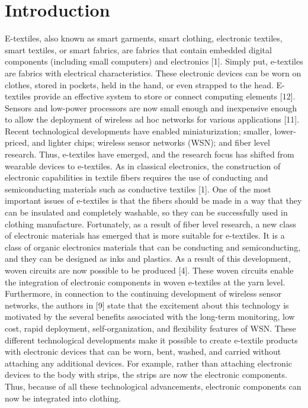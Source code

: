 \chapter{Introduction}
\label{chapter:Introduction}



	E-textiles, also known as smart garments, smart clothing, electronic textiles, smart textiles, or smart fabrics, are fabrics that contain embedded digital components (including small computers) and electronics [1]. Simply put, e-textiles are fabrics with electrical characteristics. These electronic devices can be worn on clothes, stored in pockets, held in the hand, or even strapped to the head. E-textiles provide an effective system to store or connect computing elements [12]. 
\\ 
Sensors and low-power processors are now small enough and inexpensive enough to allow the deployment of wireless ad hoc networks for various applications [11]. Recent technological developments have enabled miniaturization; smaller, lower-priced, and lighter chips; wireless sensor networks (WSN); and fiber level research. Thus, e-textiles have emerged, and the research focus has shifted from wearable devices to e-textiles. As in classical electronics, the construction of electronic capabilities in textile fibers requires the use of conducting and semiconducting materials such as conductive textiles [1]. One of the most important issues of e-textiles is that the fibers should be made in a way that they can be insulated and completely washable, so they can be successfully used in clothing manufacture. Fortunately, as a result of fiber level research, a new class of electronic materials has emerged that is more suitable for e-textiles. It is a class of organic electronics materials that can be conducting and semiconducting, and they can be designed as inks and plastics. As a result of this development, woven circuits are now possible to be produced [4]. These woven circuits enable the integration of electronic components in woven e-textiles at the yarn level. Furthermore, in connection to the continuing development of wireless sensor networks, the authors in [9] state that the excitement about this technology is motivated by the several benefits associated with the long-term monitoring, low cost, rapid deployment, self-organization, and flexibility features of WSN. These different technological developments make it possible to create e-textile products with electronic devices that can be worn, bent, washed, and carried without attaching any additional devices. For example, rather than attaching electronic devices to the body with strips, the strips are now the electronic components. Thus, because of all these technological advancements, electronic components can now be integrated into clothing. 
